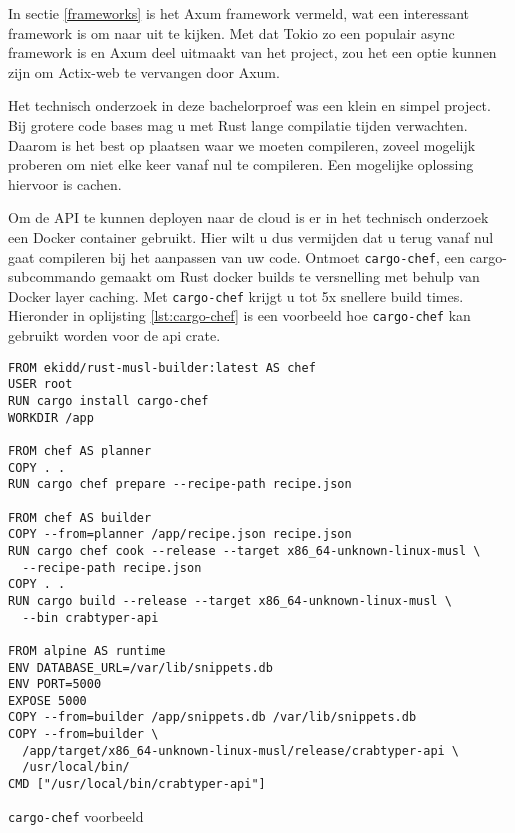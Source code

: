 \clearpage

In sectie \ref{frameworks} is het Axum framework vermeld, wat een interessant framework is om naar
uit te kijken. Met dat Tokio zo een populair async framework is en Axum deel uitmaakt van het
project, zou het een optie kunnen zijn om Actix-web te vervangen door Axum. 

Het technisch onderzoek in deze bachelorproef was een klein en simpel project. Bij grotere code
bases mag u met Rust lange compilatie tijden verwachten. Daarom is het best op plaatsen waar we
moeten compileren, zoveel mogelijk proberen om niet elke keer vanaf nul te compileren. Een mogelijke
oplossing hiervoor is cachen.

Om de API te kunnen deployen naar de cloud is er in het technisch onderzoek een Docker container
gebruikt. Hier wilt u dus vermijden dat u terug vanaf nul gaat compileren bij het aanpassen van uw
code. Ontmoet \texttt{cargo-chef}, een cargo-subcommando gemaakt om Rust docker builds te
versnelling met behulp van Docker layer caching. Met \texttt{cargo-chef} krijgt u tot 5x
snellere build times. Hieronder in oplijsting \ref{lst:cargo-chef} is een voorbeeld hoe
\texttt{cargo-chef} kan gebruikt worden voor de api crate.

\begin{listing}[h]
\begin{verbatim}
FROM ekidd/rust-musl-builder:latest AS chef
USER root
RUN cargo install cargo-chef
WORKDIR /app

FROM chef AS planner
COPY . .
RUN cargo chef prepare --recipe-path recipe.json

FROM chef AS builder
COPY --from=planner /app/recipe.json recipe.json
RUN cargo chef cook --release --target x86_64-unknown-linux-musl \
  --recipe-path recipe.json
COPY . .
RUN cargo build --release --target x86_64-unknown-linux-musl \
  --bin crabtyper-api

FROM alpine AS runtime
ENV DATABASE_URL=/var/lib/snippets.db
ENV PORT=5000
EXPOSE 5000
COPY --from=builder /app/snippets.db /var/lib/snippets.db
COPY --from=builder \
  /app/target/x86_64-unknown-linux-musl/release/crabtyper-api \
  /usr/local/bin/
CMD ["/usr/local/bin/crabtyper-api"]
\end{verbatim}
\caption{\texttt{cargo-chef} voorbeeld}
\label{lst:cargo-chef}
\end{listing}
